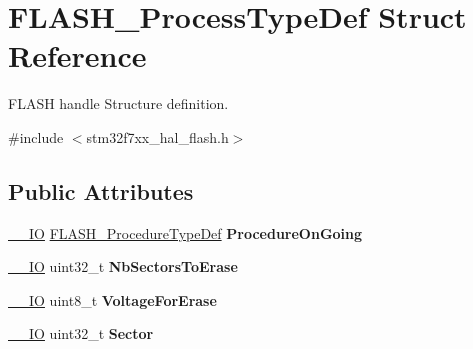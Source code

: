 \hypertarget{struct_f_l_a_s_h___process_type_def}{}\section{F\+L\+A\+S\+H\+\_\+\+Process\+Type\+Def Struct Reference}
\label{struct_f_l_a_s_h___process_type_def}


F\+L\+A\+SH handle Structure definition.  




{\ttfamily \#include $<$stm32f7xx\+\_\+hal\+\_\+flash.\+h$>$}

\subsection*{Public Attributes}
\begin{DoxyCompactItemize}
\item 
\mbox{\label{struct_f_l_a_s_h___process_type_def_adcc5fdaba7d53dffdab0510a4dd7d179}} 
\mbox{\hyperlink{core__sc300_8h_aec43007d9998a0a0e01faede4133d6be}{\+\_\+\+\_\+\+IO}} \mbox{\hyperlink{group___f_l_a_s_h___exported___types_ga2b0268387bc11bcab76be9ce7c43eaaf}{F\+L\+A\+S\+H\+\_\+\+Procedure\+Type\+Def}} {\bfseries Procedure\+On\+Going}
\item 
\mbox{\label{struct_f_l_a_s_h___process_type_def_a2b72d9ea23673332beeb57da48ededeb}} 
\mbox{\hyperlink{core__sc300_8h_aec43007d9998a0a0e01faede4133d6be}{\+\_\+\+\_\+\+IO}} uint32\+\_\+t {\bfseries Nb\+Sectors\+To\+Erase}
\item 
\mbox{\label{struct_f_l_a_s_h___process_type_def_aac2fd0eb2907b7317b0f620fb5303c21}} 
\mbox{\hyperlink{core__sc300_8h_aec43007d9998a0a0e01faede4133d6be}{\+\_\+\+\_\+\+IO}} uint8\+\_\+t {\bfseries Voltage\+For\+Erase}
\item 
\mbox{\label{struct_f_l_a_s_h___process_type_def_a0c9115ac01c2fefd3c6ad112e7133b29}} 
\mbox{\hyperlink{core__sc300_8h_aec43007d9998a0a0e01faede4133d6be}{\+\_\+\+\_\+\+IO}} uint32\+\_\+t {\bfseries Sector}
\item 
\mbox{\label{struct_f_l_a_s_h___process_type_def_a680a9b907eb67c762b16ef7051cd8942}} 

\end{DoxyCompactItemize}
